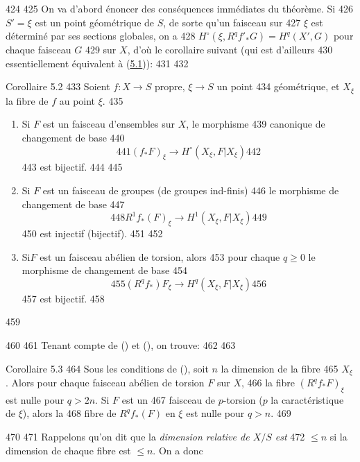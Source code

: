    424	
   425	On va d'abord énoncer des conséquences immédiates du théorème. Si
   426	$S'=\xi$ est un point géométrique de $S$, de sorte qu'un faisceau sur
   427	$\xi$ est déterminé par ses sections globales, on a
   428	$H^{\circ}(\xi,R^q{f'}_{\ast}G)=H^q(X',G)$ pour chaque faisceau $G$
   429	sur $X$, d'où le corollaire suivant (qui est d'ailleurs
   430	essentiellement équivalent à (\hyperref[XII.thm5.1]{5.1})):
   431	
   432	\begin{enonce*}{Corollaire 5.2}
   433	Soient $f:X\rightarrow S$ propre, $\xi\rightarrow S$ un point
   434	géométrique, et $X_{\xi}$ la fibre de $f$ au point $\xi$.
   435	\begin{enumerate}
   436	\renewcommand{\theenumi}{\roman{enumi}}
   437	\renewcommand{\labelenumi}{(\theenumi)}
   438	\item Si $F$ est un faisceau d'ensembles sur $X$, le morphisme
   439	  canonique de changement de base
   440	$$
   441	(f_{\ast}F)_{\xi}\longrightarrow H^{\circ}(X_{\xi},F| X_{\xi})
   442	$$
   443	est bijectif.
   444	
   445	\item Si $F$ est un faisceau de groupes (\resp de groupes ind-finis)
   446	  le morphisme de changement de base
   447	$$
   448	R^1f_{\ast}(F)_{\xi}\longrightarrow H^1(X_{\xi},F| X_{\xi})
   449	$$
   450	est injectif (\resp bijectif).
   451	
   452	\item Si\pageoriginale $F$ est un faisceau abélien de torsion, alors
   453	  pour chaque $q\geq 0$ le morphisme de changement de base
   454	$$
   455	(R^qf_{\ast})F_{\xi}\longrightarrow H^q(X_{\xi},F| X_{\xi})
   456	$$
   457	est bijectif.
   458	\end{enumerate}
   459	\end{enonce*}
   460	
   461	Tenant compte de () et (), on trouve:
   462	
   463	\begin{enonce*}{Corollaire 5.3}
   464	Sous les conditions de (), soit $n$ la dimension de la fibre
   465	$X_{\xi}$. Alors pour chaque faisceau abélien de torsion $F$ sur $X$,
   466	la fibre $(R^qf_{\ast}F)_{\xi}$ est nulle pour $q>2n$. Si $F$ est un
   467	faisceau de $p$-torsion ($p$ la caractéristique de $\xi$), alors la
   468	fibre de $R^qf_{\ast}(F)$ en $\xi$ est nulle pour $q>n$.
   469	\end{enonce*}
   470	
   471	Rappelons qu'on dit que la \emph{dimension relative de $X/S$ est}
   472	$\leq n$ si la dimension de chaque fibre est $\leq n$. On a donc
